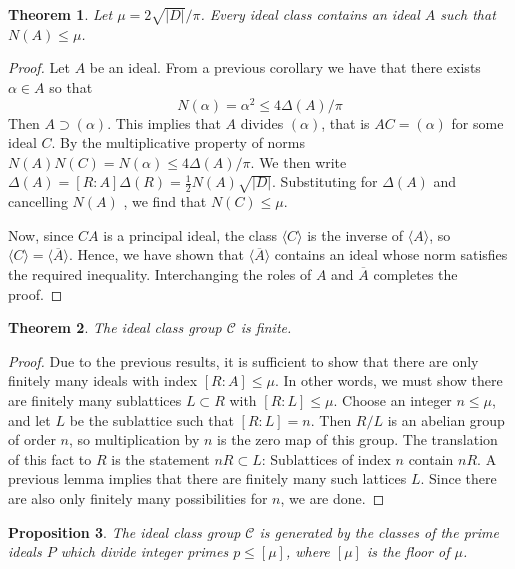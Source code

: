 \documentclass[12pt]{article}
\newtheorem{thm}{Theorem}[section]
\newtheorem{prop}[thm]{Proposition}
\theoremstyle{definition}
\theoremstyle{remark}
\numberwithin{equation}{section}
\begin{document}
\begin{thm}
        Let $\mu = 2\sqrt{|D|}/\pi$. Every ideal class contains an ideal $A$ such that $N(A) \leq \mu$.
\end{thm}
\begin{proof}
        Let $A$ be an ideal. From a previous corollary we have that there exists $\alpha \in A$ so that \begin{equation}
                N(\alpha) = \alpha^2 \leq 4\Delta(A)/\pi
        \end{equation}
        Then $A \supset (\alpha)$. This implies that $A$ divides $(\alpha)$, that is $AC = (\alpha)$ for some ideal $C$. By the multiplicative property of norms $N(A)N(C) = N(\alpha) \leq 4\Delta(A)/\pi$. We then write $\Delta(A) = [R:A]\Delta(R) = \frac{1}{2}N(A) \sqrt{|D|}$. Substituting for $\Delta(A)$ and cancelling $N(A)$ , we find that $N(C) \leq \mu$.

        Now, since $CA$ is a principal ideal, the class $\langle C \rangle$ is the inverse of $\langle A \rangle$, so $\langle C \rangle = \langle \overline{A} \rangle$. Hence, we have shown that $\langle \overline{A} \rangle$ contains an ideal whose norm satisfies the required inequality. Interchanging the roles of $A$ and $\overline{A}$ completes the proof.
\end{proof}

\vspace{15pt}


\begin{thm}
        The ideal class group $\mathcal{C}$ is finite.
\end{thm}
\begin{proof}
        Due to the previous results, it is sufficient to show that there are only finitely many ideals with index $[R:A] \leq \mu$. In other words, we must show there are finitely many sublattices $L \subset R$ with $[R:L] \leq \mu$. Choose an integer $n \leq \mu$, and let $L$ be the sublattice such that $[R:L] = n$. Then $R/L$ is an abelian group of order $n$, so multiplication by $n$ is the zero map of this group. The translation of this fact to $R$ is the statement $nR \subset L$: Sublattices of index $n$ contain $nR$. A previous lemma implies that there are finitely many such lattices $L$. Since there are also only finitely many possibilities for $n$, we are done.
\end{proof}

\vspace{15pt}

\begin{prop}
        The ideal class group $\mathcal{C}$ is generated by the classes of the prime ideals $P$ which divide integer primes $p \leq [\mu]$, where $[\mu]$ is the floor of $\mu$.
\end{prop}
\end{document}
